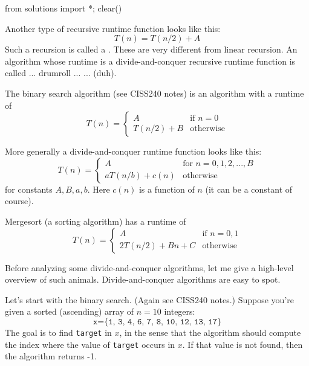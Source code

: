\begin{python0}
from solutions import *; clear()
\end{python0}

\newcommand\LEFT{\texttt{left}}
\newcommand\MID{\texttt{mid}}
\newcommand\RIGHT{\texttt{right}}
\newcommand\TARGET{\texttt{target}}
\newcommand\MERGESORT{\texttt{mergesort}}


Another type of recursive runtime function looks like this:
\[
T(n) = T(n / 2) + A
\]
Such a recursion is called a .
These are very different from linear recursion.
An algorithm whose runtime is a divide-and-conquer recursive runtime function
is called ... drumroll ... 
 ... (duh).


The binary search algorithm (see CISS240 notes) 
is an  algorithm with a runtime of 
\[
T(n) = 
\begin{cases}
A          & \text{if } n = 0 \\
T(n/2) + B & \text{otherwise}
\end{cases}
\]

More generally a divide-and-conquer runtime function looks like this:
\[
T(n) = 
\begin{cases}
A               & \text{for } n = 0, 1, 2, ..., B \\
a T(n/b) + c(n) & \text{otherwise}
\end{cases}
\]
for constants $A, B, a, b$. 
Here $c(n)$ is a function of $n$ (it can be a constant of course).

Mergesort (a sorting algorithm) has a runtime of 
\[
T(n) =
\begin{cases}
A            & \text{if $n = 0, 1$} \\
2T(n/2) + Bn + C & \text{otherwise}
\end{cases}
\]

Before analyzing some divide-and-conquer algorithms,
let me give a high-level overview of such animals.
Divide-and-conquer algorithms are easy to spot.

Let's start with the binary search.
(Again see CISS240 notes.)
Suppose you're given a sorted (ascending) array of $n=10$ integers:
\[
\texttt{x} = \texttt{\{1, 3, 4, 6, 7, 8, 10, 12, 13, 17\}}
\]
The goal is to find \verb!target! in $x$, in the sense that
the algorithm should compute the index where the value of 
\verb!target! occurs in $x$.
If that value is not found, then the algorithm returns 
-1.

